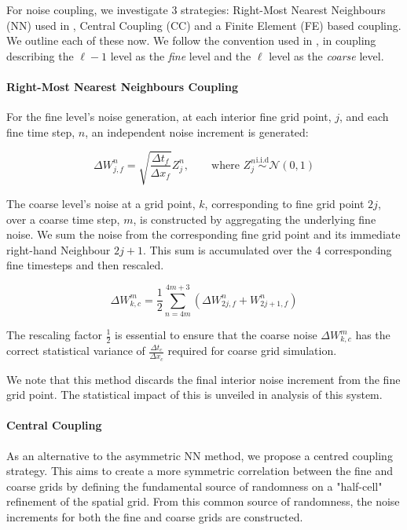 For noise coupling, we investigate 3 strategies: Right-Most Nearest Neighbours (NN)
used in \cite{cornalba2025multilevel}, Central Coupling (CC) and a Finite Element (FE)
based coupling. We outline each of these now. We follow the convention used in 
\cite{giles2015multilevel}, in coupling describing the $\ell - 1$ level as 
the \textit{fine} level and the $\ell$ level as the \textit{coarse} level.

\paragraph{Right-Most Nearest Neighbours Coupling}

For the fine level's noise generation, at each interior fine grid point, $j$, and each fine 
time step, $n$, an independent noise increment is generated:

\begin{equation}
    \Delta W_{j,f}^n = \sqrt{\frac{\Delta t_f}{\Delta x_f}} Z_j^n, \qquad \text{where } 
    Z_j^n \overset{\mathrm{i.i.d}}{\sim} \mathcal{N}(0,1)
\end{equation}

The coarse level's noise at a grid point, $k$,
corresponding to fine grid point $2j$,
over a coarse time step, $m$, is constructed by 
aggregating the underlying fine noise. We sum 
the noise from the corresponding fine grid point
and its immediate right-hand Neighbour
$2j + 1$. This sum is accumulated over 
the 4 corresponding fine timesteps 
and then rescaled.

\begin{equation}
    \Delta W_{k,c}^m = \frac{1}{2} \sum_{n = 4m}^{4m+3}
    \left(\Delta W_{2j,f}^n + W_{2j+1, f}^n \right)
\end{equation}

The rescaling factor $\frac{1}{2}$ is essential to 
ensure that the coarse noise $\Delta W_{k,c}^m$
has the correct statistical variance of 
$\frac{\Delta t_c}{\Delta x_c}$ required for 
coarse grid simulation.

We note that this method discards the final 
interior noise increment from the fine grid
point. The statistical impact of this 
is unveiled in analysis of this system.


\paragraph{Central Coupling}

As an alternative to the asymmetric NN method, we
propose a centred coupling strategy. This aims 
to create a more symmetric correlation between the fine 
and coarse grids by defining the fundamental source 
of randomness on a "half-cell" refinement of the 
spatial grid. From this common source of randomness, 
the noise increments for both the fine and coarse 
grids are constructed. 

